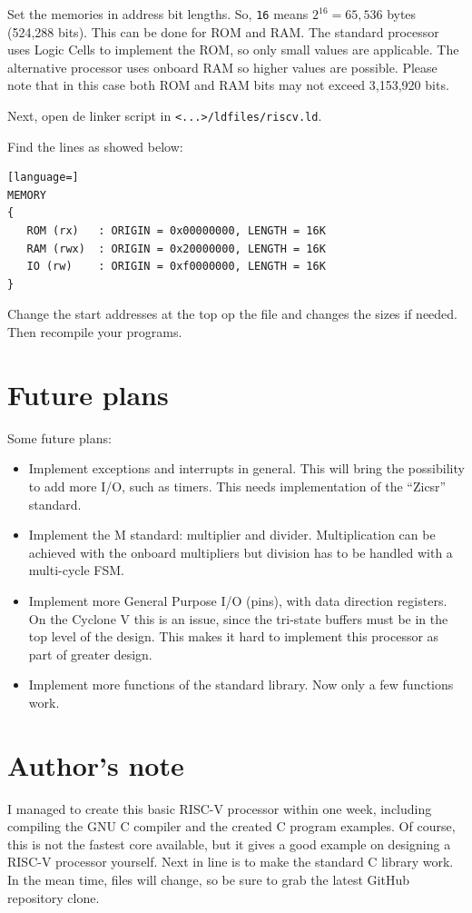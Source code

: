 \documentclass[12pt]{article}
\begin{document}
Set the memories in address bit lengths. So, \texttt{16} means $2^{16} = 65,536$ bytes (524,288 bits). This can be done for ROM and RAM. The standard processor uses Logic Cells to implement the ROM, so only small values are applicable. The alternative processor uses onboard RAM so higher values are possible. Please note that in this case both ROM and RAM bits may not exceed 3,153,920 bits.

Next, open de linker script in \lstinline|<...>/ldfiles/riscv.ld|.

Find the lines as showed below:

\begin{lstlisting}[language=]
MEMORY
{
   ROM (rx)   : ORIGIN = 0x00000000, LENGTH = 16K
   RAM (rwx)  : ORIGIN = 0x20000000, LENGTH = 16K
   IO (rw)    : ORIGIN = 0xf0000000, LENGTH = 16K
}
\end{lstlisting}

Change the start addresses at the top op the file and changes the sizes if needed.
Then recompile your programs.

\section{Future plans}
Some future plans:

\begin{itemize}
\item Implement exceptions and interrupts in general. This will bring the possibility to add more I/O, such as timers. This needs implementation of the ``Zicsr'' standard.
\item Implement the M standard: multiplier and divider. Multiplication can be achieved with the onboard multipliers but division has to be handled with a multi-cycle FSM.
\item Implement more General Purpose I/O (pins), with data direction registers. On the Cyclone V this is an issue, since the tri-state buffers must be in the top level of the design. This makes it hard to implement this processor as part of greater design.
\item Implement more functions of the standard library. Now only a few functions work.
\end{itemize}

\section{Author's note}
I managed to create this basic RISC-V processor within one week, including compiling the GNU C compiler and the created C program examples. Of course, this is not the fastest core available, but it gives a good example on designing a RISC-V processor yourself. Next in line is to make the standard C library work. In the mean time, files will change, so be sure to grab the latest GitHub repository clone.
\end{document}
